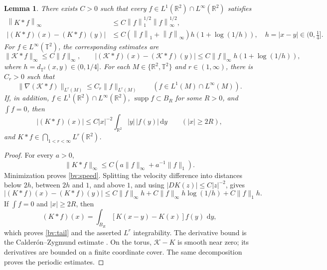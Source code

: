 \documentclass[11pt]{amsart}
\newtheorem{lemma}[theorem]{Lemma}
\theoremstyle{remark}
\numberwithin{equation}{section}
\newcommand{\norm}[1]{\left\lVert#1\right\rVert}
\newcommand{\R}{\mathbb R}
\newcommand{\T}{\mathbb T}
\newcommand{\dd}{\,\mathrm d}
\begin{document}
\begin{lemma}
\label{bv:kernel}
There exists $C>0$ such that every
$f\in L^1(\R^2)\cap L^\infty(\R^2)$ satisfies
\begin{align}
 \norm{K*f}_\infty
 &\le C\norm f_1^{1/2}\norm f_\infty^{1/2},\label{bv:speed}\\
 |(K*f)(x)-(K*f)(y)|
 &\le C(\norm f_1+\norm f_\infty)h(1+\log(1/h)),
 \quad h=|x-y|\in(0,\tfrac14].\label{bv:loglip}
\end{align}
For $f\in L^\infty(\T^2)$, the corresponding estimates are
\[
 \|\mathcal K*f\|_\infty\le C\|f\|_\infty,\qquad
 |(\mathcal K*f)(x)-(\mathcal K*f)(y)|
 \le C\|f\|_\infty h(1+\log(1/h)),
\]
where $h=d_{\T^2}(x,y)\in(0,1/4]$.
For each $M\in\{\R^2,\T^2\}$ and $r\in(1,\infty)$, there is
$C_r>0$ such that
\[
 \|\nabla(\mathcal K*f)\|_{L^r(M)}\le C_r\|f\|_{L^r(M)}
 \qquad(f\in L^1(M)\cap L^\infty(M)).
\]
If, in addition, $f\in L^1(\R^2)\cap L^\infty(\R^2)$,
$\operatorname{supp}f\subset B_R$ for some $R>0$, and $\int f=0$,
then
\begin{equation}\label{bv:tail}
 |(K*f)(x)|\le C|x|^{-2}\int_{\R^2}|y|\,|f(y)|\dd y
 \qquad(|x|\ge2R),
\end{equation}
and $K*f\in\bigcap_{1<r<\infty}L^r(\R^2)$.
\end{lemma}
\begin{proof}
For every $a>0$,
\[
 \|K*f\|_\infty\le C(a\|f\|_\infty+a^{-1}\|f\|_1).
\]
Minimization proves \eqref{bv:speed}. Splitting the velocity
difference into distances below $2h$, between $2h$ and $1$, and
above $1$, and using $|DK(z)|\le C|z|^{-2}$, gives
\[
 |(K*f)(x)-(K*f)(y)|
 \le C\|f\|_\infty h+C\|f\|_\infty h\log(1/h)+C\|f\|_1h.
\]
If $\int f=0$ and $|x|\ge2R$, then
\[
 (K*f)(x)=\int_{B_R}[K(x-y)-K(x)]f(y)\,\dd y,
\]
which proves \eqref{bv:tail} and the asserted $L^r$ integrability.
The derivative bound is the Calder\'on--Zygmund estimate
\cite[Corollary~2.10, p.~9]{TaoCZ}. On the torus,
$\mathcal K-K$ is smooth near zero; its derivatives are bounded
on a finite coordinate cover. The same decomposition proves the
periodic estimates.
\end{proof}
\end{document}
